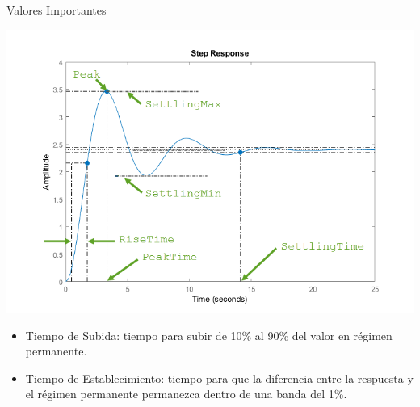 \documentclass[aspectratio=169, xcolor={usenames,svgnames,dvipsnames}]{beamer}
\begin{document}
\begin{frame}[label={sec:org39be26a}]{Valores Importantes}
\begin{center}
\includegraphics[height=0.6\textheight]{figs/RespuestaEscalon_SegundoOrden.png}
\end{center}

\begin{itemize}
\item \alert{Tiempo de Subida}: tiempo para subir de 10\% al 90\% del valor en régimen permanente.

\item \alert{Tiempo de Establecimiento}: tiempo para que la diferencia entre la respuesta y el régimen permanente permanezca dentro de una banda del 1\%.
\end{itemize}
\end{frame}
\end{document}

